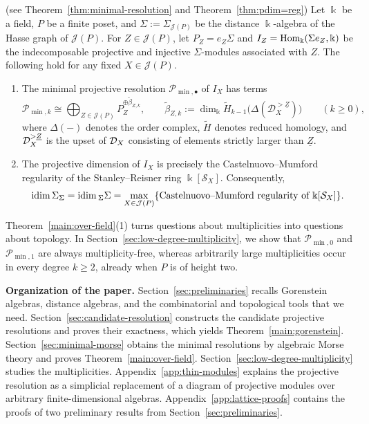 \documentclass[a4paper,leqno]{amsart}
\begin{document}
\begin{main}\label{main:over-field}
\textnormal{(see Theorem~\ref{thm:minimal-resolution} and Theorem~\ref{thm:pdim=reg})}
Let $\Bbbk$ be a field, $P$ be a finite poset, and $\Sigma:=\Sigma_{\mathcal J(P)}$ be the distance $\Bbbk$-algebra of the Hasse graph of $\mathcal J(P)$. 
For $Z\in\mathcal J(P)$, let $P_Z=e_Z\Sigma$ and $I_Z=\operatorname{Hom}_\Bbbk(\Sigma e_Z,\Bbbk)$ be the indecomposable projective and injective $\Sigma$-modules associated with $Z$. 
The following hold for any fixed $X\in\mathcal J(P)$.
\begin{enumerate}
\item The minimal projective resolution $\mathcal P_{\min,\bullet}$ of $I_X$ has terms
\[
 \mathcal P_{\min,k}\cong\bigoplus_{Z\in\mathcal J(P)}P_Z^{\oplus\widetilde\beta_{Z,k}},
 \qquad
 \widetilde\beta_{Z,k}:=\dim_\Bbbk\widetilde H_{k-1}\bigl(\Delta(\mathcal D_X^{>\underline Z})\bigr)
 \qquad(k\geq0),
\]
where $\Delta(-)$ denotes the order complex, $\widetilde{H}$ denotes reduced homology, and $\mathcal D_X^{> \underline{Z}}$ is the upset of $\mathcal D_X$ consisting of elements strictly larger than $\underline{Z}$.

\item The projective dimension of $I_X$ is precisely the Castelnuovo--Mumford regularity of the Stanley--Reisner ring $\Bbbk[\mathcal S_X]$. Consequently,
\[
 \operatorname{idim}\Sigma_\Sigma=\operatorname{idim}{}_\Sigma\Sigma=\max_{X\in\mathcal J(P)}\{ \text{Castelnuovo--Mumford regularity of }\Bbbk[\mathcal S_X] \}.
\]
\end{enumerate}
\end{main}

Theorem~\ref{main:over-field}\textup{(1)} turns questions about multiplicities into questions about topology. In Section~\ref{sec:low-degree-multiplicity}, we show that $\mathcal P_{\min,0}$ and $\mathcal P_{\min,1}$ are always multiplicity-free, whereas arbitrarily large multiplicities occur in every degree $k\geq2$, already when $P$ is of height two.

\medskip
\noindent
\textbf{Organization of the paper.} Section~\ref{sec:preliminaries} recalls Gorenstein algebras, distance algebras, and the combinatorial and topological tools that we need. Section~\ref{sec:candidate-resolution} constructs the candidate projective resolutions and  proves their exactness, which yields Theorem~\ref{main:gorenstein}. Section~\ref{sec:minimal-morse} obtains the minimal resolutions by algebraic Morse theory and proves Theorem~\ref{main:over-field}. Section~\ref{sec:low-degree-multiplicity} studies the multiplicities. Appendix~\ref{app:thin-modules} explains the projective resolution as a simplicial replacement of a diagram of projective modules over arbitrary finite-dimensional algebras. 
Appendix~\ref{app:lattice-proofs} contains the proofs of two preliminary results from Section~\ref{sec:preliminaries}.
\end{document}
